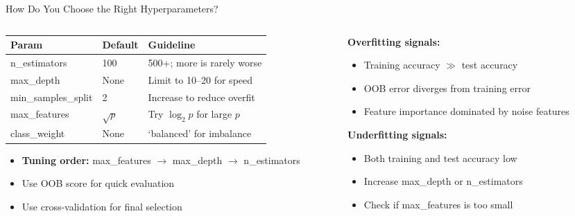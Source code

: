 \documentclass[8pt,aspectratio=169]{beamer}
\newenvironment{compactlist}{%
  \begin{itemize}%
    \setlength{\itemsep}{2pt}%
    \setlength{\parskip}{0pt}%
    \setlength{\parsep}{0pt}%
}{%
  \end{itemize}%
}
\begin{document}
\begin{frame}{How Do You Choose the Right Hyperparameters?}
\begin{columns}[T]
\begin{column}{0.55\textwidth}
\small
\renewcommand{\arraystretch}{1.15}
\footnotesize
\begin{tabular}{@{}lll@{}}
\toprule
\textbf{Param} & \textbf{Default} & \textbf{Guideline} \\
\midrule
n\_estimators & 100 & 500+; more is rarely worse \\
max\_depth & None & Limit to 10--20 for speed \\
min\_samples\_split & 2 & Increase to reduce overfit \\
max\_features & $\sqrt{p}$ & Try $\log_2 p$ for large $p$ \\
class\_weight & None & `balanced' for imbalance \\
\bottomrule
\end{tabular}

\vspace{0.5em}
\begin{compactlist}
\item \textbf{Tuning order:} max\_features $\to$ max\_depth $\to$ n\_estimators
\item Use OOB score for quick evaluation
\item Use cross-validation for final selection
\end{compactlist}
\end{column}
\begin{column}{0.42\textwidth}
\footnotesize
\textbf{Overfitting signals:}
\begin{compactlist}
\item Training accuracy $\gg$ test accuracy
\item OOB error diverges from training error
\item Feature importance dominated by noise features
\end{compactlist}

\vspace{0.5em}
\textbf{Underfitting signals:}
\begin{compactlist}
\item Both training and test accuracy low
\item Increase max\_depth or n\_estimators
\item Check if max\_features is too small
\end{compactlist}


\end{column}
\end{columns}
\end{frame}
\end{document}
